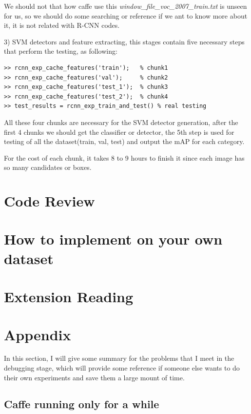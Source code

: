 \documentclass[a4]{article}
\begin{document}
We should not that how caffe use this \emph{window\_file\_voc\_2007\_train.txt} is unseen for us, so we should do some searching or reference if we ant to know more about it, it is not related with R-CNN codes.

3) SVM detectors and feature extracting, this stages contain five necessary steps that perform the testing, as following:

\begin{lstlisting}
>> rcnn_exp_cache_features('train');   % chunk1
>> rcnn_exp_cache_features('val');     % chunk2
>> rcnn_exp_cache_features('test_1');  % chunk3
>> rcnn_exp_cache_features('test_2');  % chunk4
>> test_results = rcnn_exp_train_and_test() % real testing
\end{lstlisting}

All these four chunks are necessary for the SVM detector generation, after the first 4 chunks we should get the classifier or detector, the 5th step is used for testing of all the dataset(train, val, test) and output the mAP for each category.

For the cost of each chunk, it takes 8 to 9 hours to finish it since each image has so many candidates or boxes.


\section{Code Review}


\section{How to implement on your own dataset}


\section{Extension Reading}



\section{Appendix}

In this section, I will give some summary for the problems that I meet in the debugging stage, which will provide some reference if someone else wants to do their own experiments and save them a large mount of time.


\subsection{Caffe running only for a while}
\end{document}
